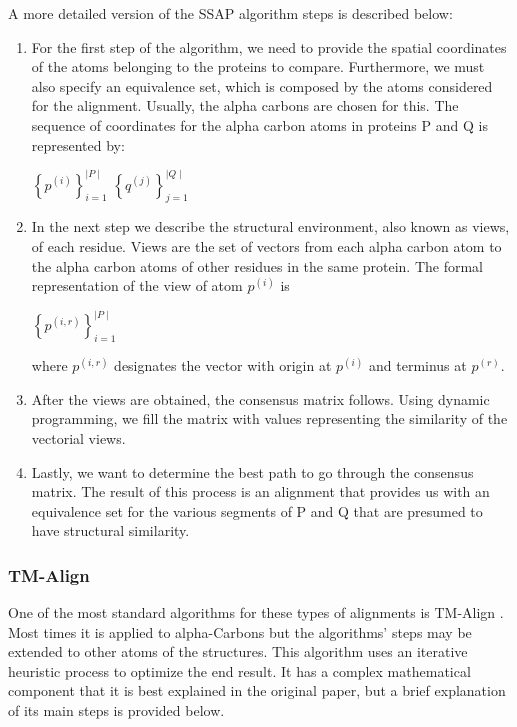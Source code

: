 A more detailed version of the SSAP algorithm steps is described below:
\begin{enumerate}
	
	\item For the first step of the algorithm, we need to provide the spatial coordinates of the atoms belonging to the proteins to compare. Furthermore, we must also specify an equivalence set, which is composed by the atoms considered for the alignment. Usually, the alpha carbons are chosen for this. The sequence of coordinates for the alpha carbon atoms in proteins P and Q is represented by:
	
	\begin{center}
		$\left\{  p^{(i)} \right\}_{i=1}^{\mid P \mid}$ \qquad $\left\{  q^{(j)} \right\}_{j=1}^{\mid Q \mid}$
	\end{center}
	
	\item In the next step we describe the structural environment, also known as views, of each residue. Views are the set of vectors from each alpha carbon atom to the alpha carbon atoms of other residues in the same protein. The formal representation of the view of atom $p^{(i)}$ is
	
	\begin{center}
		$\left\{  p^{(i,r)} \right\}_{i=1}^{\mid P \mid}$
	\end{center} 
	
	where $p^{(i,r)}$ designates the vector with origin at $p^{(i)}$ and terminus at $p^{(r)}$.
	
	\item After the views are obtained, the consensus matrix follows. Using dynamic programming, we fill the matrix with values representing the similarity of the vectorial views. 
	
	\item Lastly, we want to determine the best path to go through the consensus matrix. The result of this process is an alignment that provides us with an equivalence set for the various segments of P and Q that are presumed to have structural similarity.
\end{enumerate}

\subsubsection{TM-Align}

One of the most standard algorithms for these types of alignments is TM-Align \cite{zhang2005tm}. Most times it is applied to alpha-Carbons but the algorithms' steps may be extended to other atoms of the structures. This algorithm uses an iterative heuristic process to optimize the end result. It has a complex mathematical component that it is best explained in the original paper, but a brief explanation of its main steps is provided below. 

